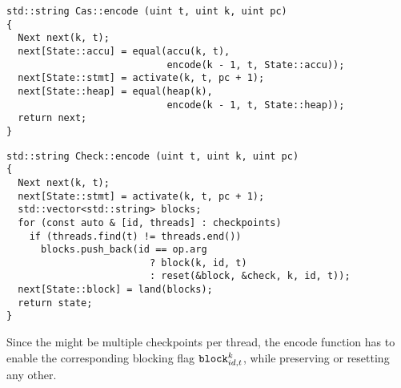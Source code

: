 
\begin{lstlisting}[style=c++, style=encode]
std::string Cas::encode (uint t, uint k, uint pc)
{
  Next next(k, t);
  next[State::accu] = equal(accu(k, t),
                            encode(k - 1, t, State::accu));
  next[State::stmt] = activate(k, t, pc + 1);
  next[State::heap] = equal(heap(k),
                            encode(k - 1, t, State::heap));
  return next;
}
\end{lstlisting}


\begin{lstlisting}[style=c++, style=encode]
std::string Check::encode (uint t, uint k, uint pc)
{
  Next next(k, t);
  next[State::stmt] = activate(k, t, pc + 1);
  std::vector<std::string> blocks;
  for (const auto & [id, threads] : checkpoints)
    if (threads.find(t) != threads.end())
      blocks.push_back(id == op.arg
                         ? block(k, id, t)
                         : reset(&block, &check, k, id, t));
  next[State::block] = land(blocks);
  return state;
}
\end{lstlisting}

\noindent
Since the might be multiple checkpoints per thread, the encode function
has to enable the corresponding blocking flag $\texttt{block}^k_{id, t}$, while preserving or resetting any other.


\newpage


